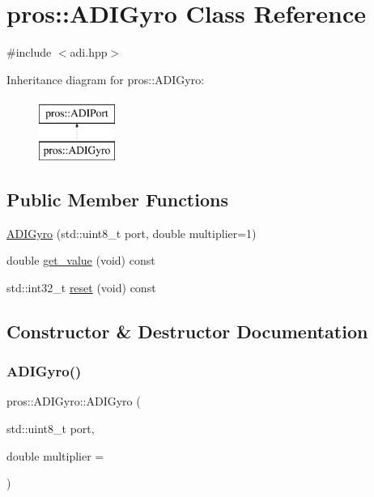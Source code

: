 \hypertarget{classpros_1_1ADIGyro}{}\section{pros\+:\+:A\+D\+I\+Gyro Class Reference}
\label{classpros_1_1ADIGyro}


{\ttfamily \#include $<$adi.\+hpp$>$}

Inheritance diagram for pros\+:\+:A\+D\+I\+Gyro\+:\begin{figure}[H]
\begin{center}
\leavevmode
\includegraphics[height=2.000000cm]{classpros_1_1ADIGyro}
\end{center}
\end{figure}
\subsection*{Public Member Functions}
\begin{DoxyCompactItemize}
\item 
\hyperlink{classpros_1_1ADIGyro_adc826b3bcb88213a0df283178279662a}{A\+D\+I\+Gyro} (std\+::uint8\+\_\+t port, double multiplier=1)
\item 
double \hyperlink{classpros_1_1ADIGyro_a829f933aaaa370483c36aba9f4a4f09c}{get\+\_\+value} (void) const
\item 
std\+::int32\+\_\+t \hyperlink{classpros_1_1ADIGyro_a3e2df8c21f4eb0bfa3559834221195fe}{reset} (void) const
\end{DoxyCompactItemize}


\subsection{Constructor \& Destructor Documentation}
\mbox{\label{classpros_1_1ADIGyro_adc826b3bcb88213a0df283178279662a}} 
\subsubsection{\texorpdfstring{A\+D\+I\+Gyro()}{ADIGyro()}}
{\footnotesize\ttfamily pros\+::\+A\+D\+I\+Gyro\+::\+A\+D\+I\+Gyro (\begin{DoxyParamCaption}\item[{std\+::uint8\+\_\+t}]{port,  }\item[{double}]{multiplier = {} }\end{DoxyParamCaption})}

